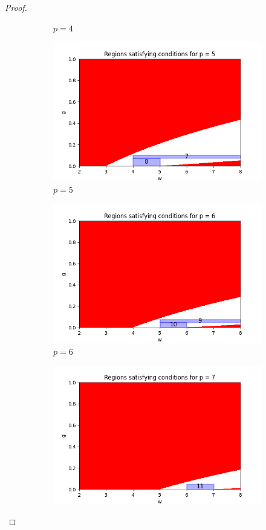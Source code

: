 \documentclass{article}
\begin{document}
\begin{proof}
\begin{figure}[ht]
\begin{subfigure}{0.32\textwidth}
        \caption{$p = 4$}
    \end{subfigure}
    \hfill
    \begin{subfigure}{0.32\textwidth}
       \includegraphics[width=\linewidth]{plotsexcom/plot_p_5.png}
        \caption{$p = 5$}
    \end{subfigure}
    \medskip
    \begin{subfigure}{0.32\textwidth}
        \includegraphics[width=\linewidth]{plotsexcom/plot_p_6.png}
        \caption{$p = 6$}
    \end{subfigure}
    \hfill
    \begin{subfigure}{0.32\textwidth}
        \includegraphics[width=\linewidth]{plotsexcom/plot_p_7.png}

\end{subfigure}
\end{figure}
\end{proof}
\end{document}
